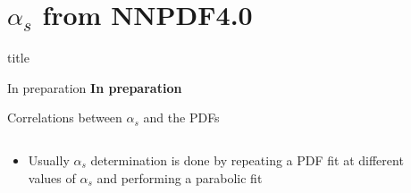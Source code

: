\documentclass[8pt,t]{beamer}
\newcommand{\SectionTitleFrame}[1][]{%
  \begin{frame}
    \vfill
    \centering
    \begin{beamercolorbox}[sep=8pt,center,shadow=true,rounded=true]{title}
      \usebeamerfont{title}\insertsection\par
    \end{beamercolorbox}
    \ifx\relax#1\relax\else
      \vspace{0.5cm}
      \textbf{#1}
    \fi
    \vfill
  \end{frame}
}
\begin{document}
\section*{$\alpha_s$ from NNPDF4.0}
\SectionTitleFrame[In preparation]



\begin{frame}{Correlations between $\alpha_s$ and the PDFs}
  \begin{columns}[T]
    \begin{column}{0.49\textwidth}
      \begin{itemize}
        \item Usually $\alpha_s$ determination is done by repeating a PDF fit at different values of $\alpha_s$ and performing a parabolic fit
      \end{itemize}
    \end{column}
    \begin{column}{0.49\textwidth}
    \end{column}
  \end{columns}
\end{frame}
\end{document}
